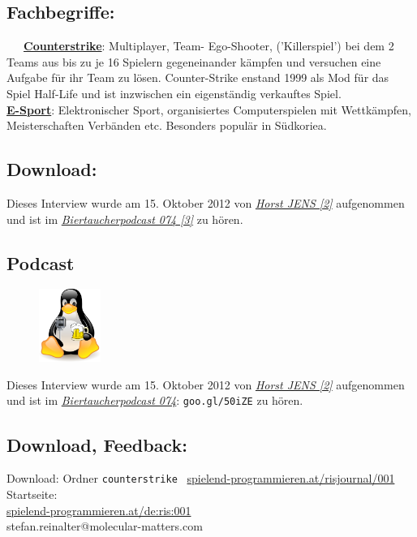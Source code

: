 \subsection*{Fachbegriffe:}

~~~\href{http://de.wikipedia.org/wiki/Counter-Strike}{\textbf{Counterstrike}}: Multiplayer, Team- Ego-Shooter, ('Killerspiel') bei dem 2 Teams aus bis zu je 16 Spielern gegeneinander kämpfen und versuchen eine Aufgabe für ihr Team zu lösen. Counter-Strike enstand 1999 als Mod für das Spiel Half-Life und ist inzwischen ein eigenständig verkauftes Spiel.  \\

\href{http://de.wikipedia.org/wiki/E-Sport}{\textbf{E-Sport}}: Elektronischer Sport, organisiertes Computerspielen mit Wettkämpfen, Meisterschaften Verbänden etc. Besonders populär in Südkoriea. \\

\subsection*{Download:}
Dieses Interview  wurde am 15. Oktober 2012 von \href{http://spielend-programmieren.at}{\textit{Horst JENS [2]}} aufgenommen und ist im \href{http://spielend-programmieren.at/de:podcast:biertaucher:2012:074}{\textit{Biertaucherpodcast 074 [3]}} zu hören.  

\subsection*{Podcast}
\begin{figure}
\includegraphics[width=2cm]{nomad/biertaucherlogo.png}
\end{figure}
Dieses Interview  wurde am 15. Oktober 2012 von \href{http://spielend-programmieren.at}{\textit{Horst JENS [2]}} aufgenommen und ist im \href{http://spielend-programmieren.at/de:podcast:biertaucher:2012:074}{\textit{Biertaucherpodcast 074}}: \texttt{goo.gl/50iZE} zu hören.

\subsection*{Download, Feedback:}
\footnotesize{
Download: Ordner \texttt{counterstrike} \Mundus\ \href{http://spielend-programmieren.at/risjournal/001}{spielend-programmieren.at/risjournal/001}\\
Startseite:\\
\href{http://spielend-programmieren.at/de:ris:001}{spielend-programmieren.at/de:ris:001}\\ 
\Letter\: stefan.reinalter@molecular-matters.com\\}
\normalsize 

